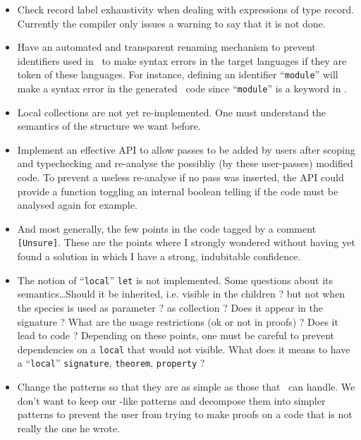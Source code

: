 \begin{itemize}
\item Check record label exhaustivity when dealing with expressions of
  type record. Currently the compiler only issues a warning to say
  that it is not done.
  
\item Have an automated and transparent renaming mechanism to prevent
  identifiers used in \focalize\ to make syntax errors in the target
  languages if they are token of these languages. For instance,
  defining an identifier ``{\tt module}'' will make a syntax error in
  the generated \ocaml\ code since ``{\tt module}'' is a keyword in
  \ocaml.

\item Local collections are not yet re-implemented. One must
  understand the semantics of the structure we want before.

\item Implement an effective API to allow passes to be added by users
  after scoping and typechecking and re-analyse the possibliy (by
  these user-passes) modified code. To prevent a useless re-analyse if
  no pass was inserted, the API could provide a function toggling an
  internal boolean telling if the code must be analysed again for
  example.

\item And most generally, the few points in the code tagged by a
  comment  {\tt [Unsure]}. These are the points where I strongly
  wondered without having yet found a solution in which I have a
  strong, indubitable confidence.

\item The notion of ``{\tt local}'' {\tt let} is not implemented. Some
  questions about its semantics\ldots Should it be inherited,
  i.e. visible in the children ? but not when the species is used as
  parameter ? as collection ? Does it appear in the signature ? What
  are the usage restrictions (ok or not in proofs) ? Does it lead to
  code ? Depending on these points, one must be careful to prevent
  dependencies on a {\tt local} that would not visible. What does it
  means to have a ``{\tt local}'' {\tt signature}, {\tt theorem},
  {\tt property} ?

\item Change the patterns so that they are as simple as those that
  \coq\ can handle. We don't want to keep our \ocaml-like patterns and
  decompose them into simpler patterns to prevent the user from trying
  to make proofs on a code that is not really the one he wrote.


\end{itemize}
